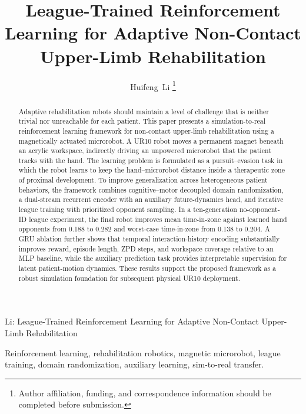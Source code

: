 \documentclass[lettersize,journal]{IEEEtran}
\begin{document}
\title{League-Trained Reinforcement Learning for Adaptive Non-Contact Upper-Limb Rehabilitation}

\author{Huifeng~Li
\thanks{Author affiliation, funding, and correspondence information should be completed before submission.}}

%
{Li: League-Trained Reinforcement Learning for Adaptive Non-Contact Upper-Limb Rehabilitation}

\maketitle

\begin{abstract}
Adaptive rehabilitation robots should maintain a level of challenge that is neither trivial nor unreachable for each patient. This paper presents a simulation-to-real reinforcement learning framework for non-contact upper-limb rehabilitation using a magnetically actuated microrobot. A UR10 robot moves a permanent magnet beneath an acrylic workspace, indirectly driving an unpowered microrobot that the patient tracks with the hand. The learning problem is formulated as a pursuit--evasion task in which the robot learns to keep the hand--microrobot distance inside a therapeutic zone of proximal development. To improve generalization across heterogeneous patient behaviors, the framework combines cognitive--motor decoupled domain randomization, a dual-stream recurrent encoder with an auxiliary future-dynamics head, and iterative league training with prioritized opponent sampling. In a ten-generation no-opponent-ID league experiment, the final robot improves mean time-in-zone against learned hand opponents from 0.188 to 0.282 and worst-case time-in-zone from 0.138 to 0.204. A GRU ablation further shows that temporal interaction-history encoding substantially improves reward, episode length, ZPD steps, and workspace coverage relative to an MLP baseline, while the auxiliary prediction task provides interpretable supervision for latent patient-motion dynamics. These results support the proposed framework as a robust simulation foundation for subsequent physical UR10 deployment.
\end{abstract}

\begin{IEEEkeywords}
Reinforcement learning, rehabilitation robotics, magnetic microrobot, league training, domain randomization, auxiliary learning, sim-to-real transfer.
\end{IEEEkeywords}
\end{document}
